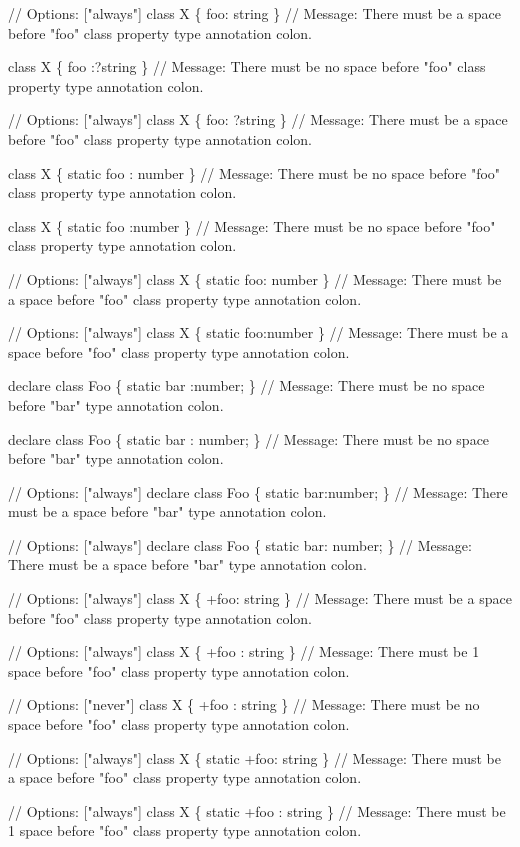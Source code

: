 \begin{DoxyCode}
// Options: ["always"]
class X \{ foo: string \}
// Message: There must be a space before "foo" class property type annotation colon.

class X \{ foo :?string \}
// Message: There must be no space before "foo" class property type annotation colon.

// Options: ["always"]
class X \{ foo: ?string \}
// Message: There must be a space before "foo" class property type annotation colon.

class X \{ static foo : number \}
// Message: There must be no space before "foo" class property type annotation colon.

class X \{ static foo :number \}
// Message: There must be no space before "foo" class property type annotation colon.

// Options: ["always"]
class X \{ static foo: number \}
// Message: There must be a space before "foo" class property type annotation colon.

// Options: ["always"]
class X \{ static foo:number \}
// Message: There must be a space before "foo" class property type annotation colon.

declare class Foo \{ static bar :number; \}
// Message: There must be no space before "bar" type annotation colon.

declare class Foo \{ static bar : number; \}
// Message: There must be no space before "bar" type annotation colon.

// Options: ["always"]
declare class Foo \{ static bar:number; \}
// Message: There must be a space before "bar" type annotation colon.

// Options: ["always"]
declare class Foo \{ static bar: number; \}
// Message: There must be a space before "bar" type annotation colon.

// Options: ["always"]
class X \{ +foo: string \}
// Message: There must be a space before "foo" class property type annotation colon.

// Options: ["always"]
class X \{ +foo  : string \}
// Message: There must be 1 space before "foo" class property type annotation colon.

// Options: ["never"]
class X \{ +foo : string \}
// Message: There must be no space before "foo" class property type annotation colon.

// Options: ["always"]
class X \{ static +foo: string \}
// Message: There must be a space before "foo" class property type annotation colon.

// Options: ["always"]
class X \{ static +foo  : string \}
// Message: There must be 1 space before "foo" class property type annotation colon.


\end{DoxyCode}

